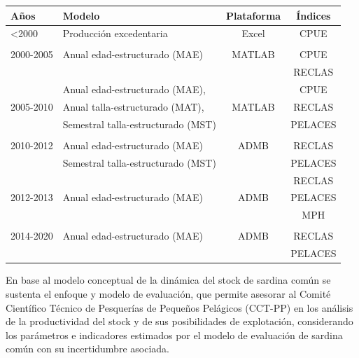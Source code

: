 \documentclass[
  spanish,
]{article}
\begin{document}
\begin{table}[h]
    \centering
    \resizebox{13cm}{!} {
    \begin{tabular}{|l|l|c|c|}
    \hline
Años       & Modelo                               & Plataforma   & Índices   \\ \hline   
<2000      & Producción excedentaria              & Excel        & CPUE      \\ \hline
           &                                      &              &           \\ 
2000-2005  & Anual edad-estructurado (MAE)        & MATLAB       & CPUE      \\
           &                                      &              & RECLAS    \\ \hline        
           & Anual edad-estructurado (MAE),       &              & CPUE      \\
2005-2010  & Anual talla-estructurado (MAT),      & MATLAB       & RECLAS    \\
           & Semestral talla-estructurado (MST)   &              & PELACES   \\ \hline
           &                                      &              &           \\
2010-2012  & Anual edad-estructurado (MAE)        & ADMB         & RECLAS    \\
           & Semestral talla-estructurado (MST)   &              & PELACES   \\ \hline
           &                                      &              & RECLAS    \\
2012-2013  & Anual edad-estructurado (MAE)        & ADMB         & PELACES   \\
           &                                      &              & MPH       \\ \hline
           &                                      &              &           \\
2014-2020  & Anual edad-estructurado (MAE)        & ADMB         & RECLAS    \\
           &                                      &              & PELACES   \\ \hline
  \end{tabular}}
        \end{table}

\normalsize

En base al modelo conceptual de la dinámica del stock de sardina común
se sustenta el enfoque y modelo de evaluación, que permite asesorar al
Comité Científico Técnico de Pesquerías de Pequeños Pelágicos (CCT-PP)
en los análisis de la productividad del stock y de sus posibilidades de
explotación, considerando los parámetros e indicadores estimados por el
modelo de evaluación de sardina común con su incertidumbre asociada.
\end{document}
